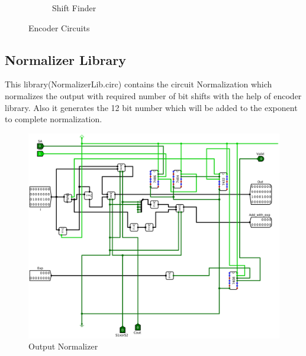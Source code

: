 \documentclass[12pt]{article}
\begin{document}
\begin{figure}[H]
\begin{subfigure}[b]{0.9\textwidth}
        \caption{Shift Finder}
        \label{fig:shiftfinder}
    \end{subfigure}
    \caption{Encoder Circuits}\label{fig:encoder}
\end{figure}

\subsection{Normalizer Library}
This library(NormalizerLib.circ) contains the circuit Normalization which normalizes the output with required number of bit shifts with the help of encoder library. Also it generates the 12 bit number which will be added to the exponent to complete normalization.
\begin{figure}[H]
    \centering
        \includegraphics[width=\textwidth]{Images/Normalization.png}
    \caption{Output Normalizer}\label{fig:normalizer}
\end{figure}
\end{document}
